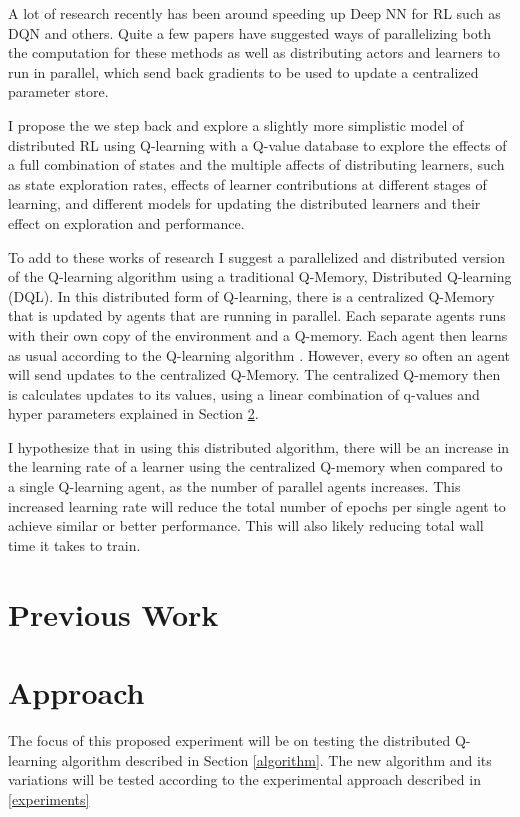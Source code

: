 \documentclass[jair,twoside,11pt,theapa]{article}
\begin{document}
A lot of research recently has been around speeding up Deep NN for RL such as DQN and others. Quite a few papers have suggested ways of parallelizing both the computation for these methods as well as distributing actors and learners to run in parallel, which send back gradients to be used to update a centralized parameter store. 

I propose the we step back and explore a slightly more simplistic model of distributed RL using Q-learning with a Q-value database to explore the effects of a full combination of states and the multiple affects of distributing learners, such as state exploration rates, effects of learner contributions at different stages of learning, and different models for updating the distributed learners and their effect on exploration and performance. 

To add to these works of research I suggest a parallelized and distributed version of the Q-learning algorithm using a traditional Q-Memory, Distributed Q-learning (DQL).
In this distributed form of Q-learning, there is a centralized Q-Memory that is updated by agents that are running in parallel. Each separate agents runs with their own copy of the environment and a Q-memory. Each agent then learns as usual according to the Q-learning algorithm \cite{watkins}. However, every so often an agent will send updates to the centralized 
Q-Memory. 
The centralized Q-memory then is calculates updates to its values, using a linear combination of q-values and hyper parameters explained in Section \ref{Approach}. 

I hypothesize that in using this distributed algorithm, there will be an increase in the learning rate of a learner using the centralized Q-memory when compared to a single Q-learning agent, as the number of parallel agents increases. This increased learning rate will reduce the total number of epochs per single agent to achieve similar or better performance. This will also likely reducing total wall time it takes to train. 

\section{Previous Work}
\label{Literature Survey}

\section{Approach}
\label{Approach}
The focus of this proposed experiment will be on testing the distributed Q-learning algorithm described in Section \ref{algorithm}.
The new algorithm and its variations will be tested according to the experimental approach described in \ref{experiments}
\end{document}
